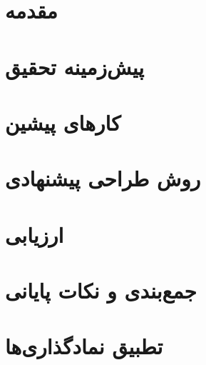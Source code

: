 \documentclass[twoside, a4paper,11pt]{book}
\numberwithin{equation}{chapter}
\numberwithin{table}{chapter}
\numberwithin{figure}{chapter}
\numberwithin{equation}{chapter}
\begin{document}


\newpage
\thispagestyle{empty}
\mbox{}

\small{
\tableofcontents
\listoffigures
}


\newpage


\pagestyle{fancy}
\fancyhead{} 
\fancyhead[RO]{\leftmark}
\fancyhead[LO]{\thepage}
\fancyhead[LE]{\rightmark}
\fancyhead[RE]{\thepage}
\fancyfoot{} 
\renewcommand{\headrulewidth}{0.6pt} 
\renewcommand{\footrulewidth}{0pt}

\setcounter{page}{1}

\chapter{مقدمه}
\label{chapter:Introduction}
\thispagestyle{plain}

\chapter{پیش‌زمینه تحقیق}
\label{chapter:Preliminaries}
\thispagestyle{plain}

\chapter{کارهای پیشین}
\label{chapter:RelatedWork}
\thispagestyle{plain}

\chapter{روش طراحی پیشنهادی}
\label{chapter:proposedFramework}
\thispagestyle{plain}

\chapter{ارزیابی}
\label{chapter:evaluation}
\thispagestyle{plain}

\chapter{جمع‌بندی و نکات پایانی}
\label{chapter:Conclusion}
\thispagestyle{plain}


\appendix
\chapter{تطبیق نمادگذاری‌ها}
\label{appendix}
\thispagestyle{plain}

\newpage
\end{document}
